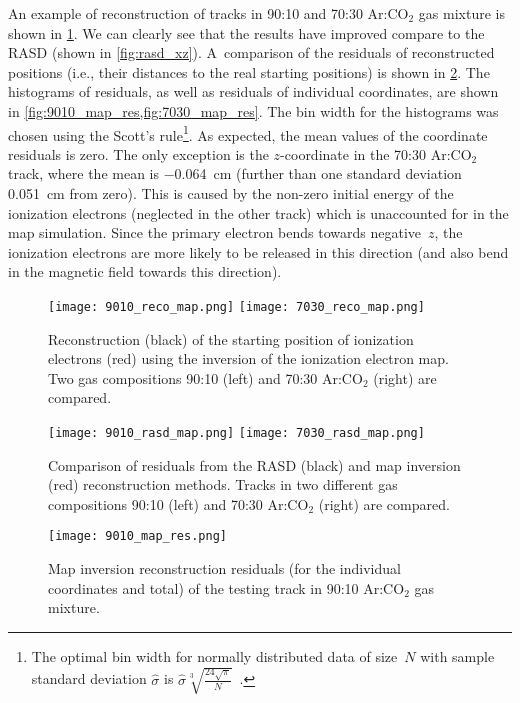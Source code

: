 			An example of reconstruction of tracks in 90:10 and 70:30 Ar:CO$_2$ gas mixture is shown in \cref{fig:reco_map}. We can clearly see that the results have improved compare to the \acf{RASD} (shown in \cref{fig:rasd_xz}). A~comparison of the residuals of reconstructed positions (i.e., their distances to the real starting positions) is shown in \cref{fig:rasd_map}. The histograms of residuals, as well as residuals of individual coordinates, are shown in \cref{fig:9010_map_res,fig:7030_map_res}. The bin width for the histograms was chosen using the Scott's rule\footnote{The optimal bin width for normally distributed data of size~$N$ with sample standard deviation $\hat{\sigma}$ is $\hat{\sigma}\sqrt[3]{\frac{24\sqrt{\pi}}{N}}$~\cite{scott}.}. As expected, the mean values of the coordinate residuals is zero. The only exception is the $z$\nobreakdash-coordinate in the 70:30 Ar:CO$_2$ track, where the mean is \qty{-0.064}{\cm} (further than one standard deviation \qty{0.051}{\cm} from zero). This is caused by the non-zero initial energy of the ionization electrons (neglected in the other track) which is unaccounted for in the map simulation. Since the primary electron bends towards negative~$z$, the ionization electrons are more likely to be released in this direction (and also bend in the magnetic field towards this direction).
			
			\begin{figure}
				\centering
				\texttt{[image: 9010\_reco\_map.png]}
				\hfill
				\texttt{[image: 7030\_reco\_map.png]}
				\caption{Reconstruction (black) of the starting position of ionization electrons (red) using the inversion of the ionization electron map. Two gas compositions 90:10 (left) and 70:30 Ar:CO$_2$ (right) are compared.}
				\label{fig:reco_map}
			\end{figure}
			
			\begin{figure}
				\centering
				\texttt{[image: 9010\_rasd\_map.png]}
				\hfill
				\texttt{[image: 7030\_rasd\_map.png]}
				\caption{Comparison of residuals from the \ac{RASD} (black) and map inversion (red) reconstruction methods. Tracks in two different gas compositions 90:10 (left) and 70:30 Ar:CO$_2$ (right) are compared.}
				\label{fig:rasd_map}
			\end{figure}
			
			\begin{figure}
				\centering
				\texttt{[image: 9010\_map\_res.png]}
				\caption{Map inversion reconstruction residuals (for the individual coordinates and total) of the testing track in 90:10 Ar:CO$_2$ gas mixture.}
				\label{fig:9010_map_res}
			\end{figure}
			
